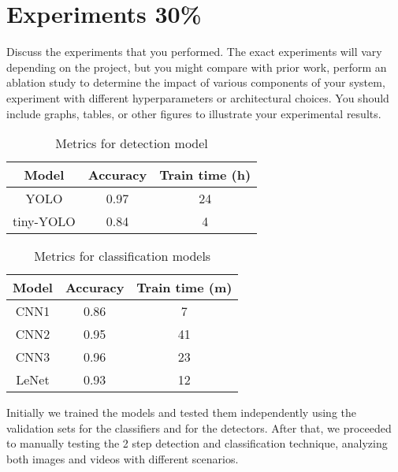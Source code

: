 \section{Experiments 30\%}
Discuss the experiments that you performed. The exact experiments will vary depending on the project, but you might compare with prior work, perform an ablation study to determine the impact of various components of your system, experiment with different hyperparameters or architectural choices. You should include graphs, tables, or other figures to illustrate your experimental results.

\begin{table}
	\begin{center}
		\begin{tabular}{|c|c|c|}
			\hline
			Model & Accuracy & Train time (h) \\
			\hline\hline
			YOLO & 0.97 & 24 \\
			tiny-YOLO & 0.84 & 4 \\
			\hline
		\end{tabular}
	\end{center}
	\caption{Metrics for detection model}
	\label{yolo-metrics}
\end{table}

\begin{table}
	\begin{center}
		\begin{tabular}{|c|c|c|}
			\hline
			Model & Accuracy & Train time (m) \\
			\hline\hline
			CNN1 & 0.86 & 7 \\
			CNN2 & 0.95 & 41 \\
			CNN3 & 0.96 & 23 \\
			LeNet & 0.93 & 12 \\
			\hline
		\end{tabular}
	\end{center}
	\caption{Metrics for classification models}
	\label{class-metrics}
\end{table}

Initially we trained the models and tested them independently using the validation sets for the classifiers and for the detectors. After that, we proceeded to manually testing the 2 step detection and classification technique, analyzing both images and videos with different scenarios. 



